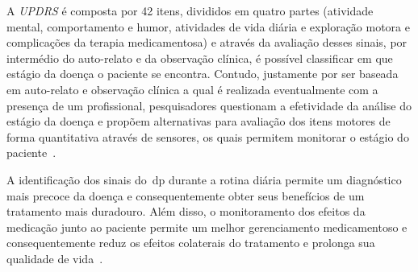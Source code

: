 A \textit{UPDRS} é composta por 42 itens, divididos em quatro partes (atividade mental, comportamento e humor, atividades de vida diária e exploração motora e complicações da terapia medicamentosa) e através da avaliação desses sinais, por intermédio do auto-relato e da observação clínica, é possível classificar em que estágio da doença o paciente se encontra. Contudo, justamente por ser baseada em auto-relato e observação clínica a qual é realizada eventualmente com a presença de um profissional, pesquisadores questionam a efetividade da análise do estágio da doença e propõem alternativas para avaliação dos itens motores de forma quantitativa através de sensores, os quais permitem monitorar o estágio do paciente~\cite{kostek12,synnott_wiipd_2012,patel_monitoring_2009}.


A identificação dos sinais do~\ac{dp} durante a rotina diária permite um diagnóstico mais precoce da doença e consequentemente obter seus benefícios de um tratamento mais duradouro. Além disso, o monitoramento dos efeitos da medicação junto ao paciente permite um melhor gerenciamento medicamentoso e consequentemente reduz os efeitos colaterais do tratamento e prolonga sua qualidade de vida~\cite{rowlandtratado}.


